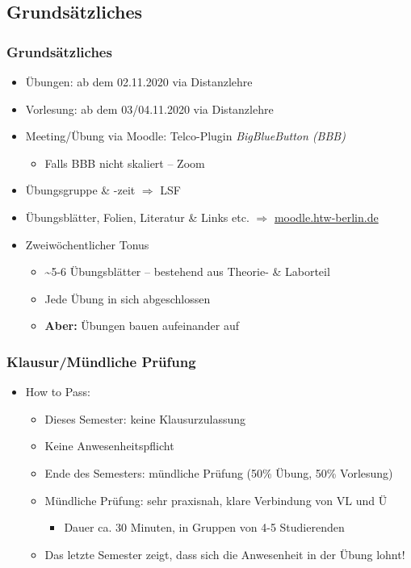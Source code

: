 \documentclass[xcolor=dvipsnames,aspectratio=169]{beamer}
\begin{document}
\subsection{Grundsätzliches}
\begin{frame}
	\frametitle{Grundsätzliches}
	\begin{itemize}
		\item Übungen: ab dem 02.11.2020 via Distanzlehre
		\item Vorlesung: ab dem 03/04.11.2020 via Distanzlehre
		\item Meeting/Übung via Moodle: Telco-Plugin \emph{BigBlueButton (BBB)}
		\begin{itemize}
			\item Falls BBB nicht skaliert -- Zoom
		\end{itemize}
		\item Übungsgruppe \& -zeit $\Rightarrow$ LSF
		\item Übungsblätter, Folien, Literatur \& Links etc. $\Rightarrow$ \url{moodle.htw-berlin.de}
		\item Zweiwöchentlicher Tonus 
		\begin{itemize}
			\item \textasciitilde 5-6 Übungsblätter -- bestehend aus Theorie- \& Laborteil
			\item Jede Übung in sich abgeschlossen
			\item \textbf{Aber:} Übungen bauen aufeinander auf
		\end{itemize}
	\end{itemize}
\end{frame}

\begin{frame}
	\frametitle{Klausur/Mündliche Prüfung}
	\begin{itemize}
		\item How to Pass:
		\begin{itemize}
			\item Dieses Semester: keine Klausurzulassung
			\item Keine Anwesenheitspflicht
			\item Ende des Semesters: mündliche Prüfung (50\% Übung, 50\% Vorlesung)
			\item Mündliche Prüfung: sehr praxisnah, klare Verbindung von VL und Ü
			\begin{itemize}
				\item Dauer ca. 30 Minuten, in Gruppen von 4-5 Studierenden
			\end{itemize}
			\item Das letzte Semester zeigt, dass sich die Anwesenheit in der Übung lohnt!
		\end{itemize}
	\end{itemize}
\end{frame}
\end{document}
